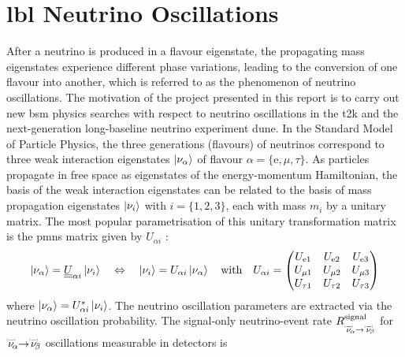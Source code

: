 \section{\texorpdfstring{\acrlong{lbl}}{TEXT} Neutrino Oscillations}\label{subsec:lbl_osc}
%
%
After a neutrino is produced in a flavour eigenstate, the propagating mass eigenstates experience different phase variations, leading  to the conversion of one flavour into another, which is referred to as the phenomenon of neutrino oscillations. The motivation of the project presented in this report is to carry out new \acrfull{bsm} physics searches with respect to neutrino oscillations in the \acrfull{t2k} and the next-generation long-baseline neutrino experiment \acrfull{dune}.
In the Standard Model of Particle Physics, the three generations (flavours) of neutrinos correspond to three weak interaction eigenstates $\ket{\nu_\alpha}$ of flavour $\alpha = \{\text{e},\mu,\tau\}$. As particles propagate in free space as eigenstates of the energy-momentum Hamiltonian, the basis of the weak interaction eigenstates can be related to the basis of mass propagation eigenstates $\ket{\nu_i}$ with $i=\{1,2,3\}$, each with mass $m_i$ by a unitary matrix. The most popular parametrisation of this unitary transformation matrix is the \acrfull{pmns} matrix given by $U_{\alpha i}$ \cite{Kayser:2005cd}:
\vspace{-2mm}%
%
\begin{align} \label{pmns}
\ket{\nu_\alpha} = \underline{\underline{U}}_{\alpha i} \ket{\nu_i} \quad \Leftrightarrow \quad \ket{\nu_i} =  U_{\alpha i}\ket{\nu_\alpha} \quad 
\text{with} \quad U_{\alpha i} =
\begin{pmatrix}
    U_{\text{e}1} & U_{\text{e}2} & U_{\text{e}3} \\
    U_{\mu 1} & U_{\mu 2} & U_{\mu 3} \\
    U_{\tau 1} & U_{\tau 2} & U_{\tau 3}
\end{pmatrix}
\end{align}
%
where $\ket{\nu_\alpha} =  U_{\alpha i}^*\ket{\nu_i}$.
The neutrino oscillation parameters are extracted via the neutrino oscillation probability. %
The signal-only neutrino-event rate $R^\text{signal}_{\overset{\brobor}{\nu}_{\hspace{-1mm}\alpha} \rightarrow \overset{\brobor}{\nu}_{\hspace{-1mm}\beta}}$ for $\overset{\brobor}{\nu}_{\hspace{-1mm}\alpha} \hspace{-1mm} \rightarrow \hspace{-1mm} \overset{\brobor}{\nu}_{\hspace{-1mm}\beta}$ oscillations measurable in detectors is \cite{doi:10.1146/annurev-nucl-101917-020930}
